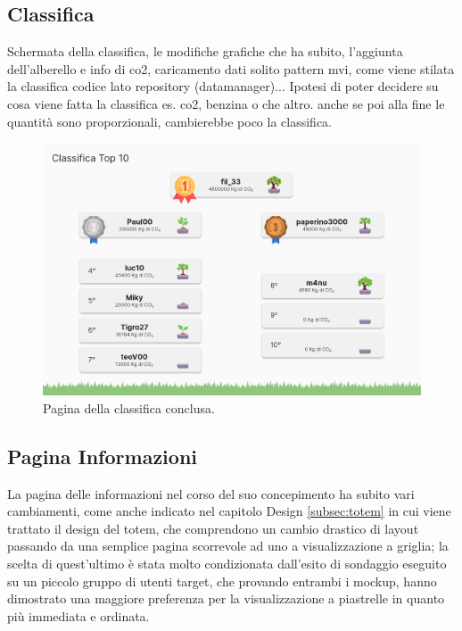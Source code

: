 %
%
\subsection{Classifica}
Schermata della classifica, le modifiche grafiche che ha subito, l'aggiunta dell'alberello e info di co2, caricamento dati solito pattern mvi, come viene stilata la classifica codice lato repository (datamanager)... Ipotesi di poter decidere su cosa viene fatta la classifica es. co2, benzina o che altro. anche se poi alla fine le quantità sono proporzionali, cambierebbe poco la classifica.


\begin{figure}[h]
  \centering
  \includegraphics[width=\textwidth]{img/totem/screenshot/top10screen.png}
  \caption{Pagina della classifica conclusa.}
  \label{fig:top10screen}
\end{figure}

%
%
\subsection{Pagina Informazioni}
La pagina delle informazioni nel corso del suo concepimento ha subito vari cambiamenti, come anche indicato nel capitolo Design \ref{subsec:totem} in cui viene trattato il design del totem, che comprendono un cambio drastico di layout passando da una semplice pagina scorrevole ad uno a visualizzazione a griglia; la scelta di quest'ultimo è stata molto condizionata dall'esito di sondaggio eseguito su un piccolo gruppo di utenti target, che provando entrambi i mockup, hanno dimostrato una maggiore preferenza per la visualizzazione a piastrelle in quanto più immediata e ordinata.


